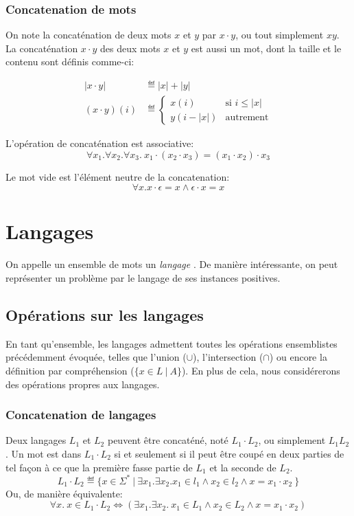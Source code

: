 \subsubsection{Concatenation de mots}

On note la concaténation de deux mots $x$ et $y$ par $x \cdot y$, ou tout simplement $xy$.
La concaténation $x \cdot y$ des deux mots $x$ et $y$ est aussi un mot, dont la taille et le contenu sont définis comme-ci:

\begin{align*}
|x \cdot y| &\eqdef |x| + |y|\\
(x \cdot y)(i) &\eqdef \begin{cases}
x(i) & \text{si $i \leq |x|$}\\
y(i - |x|) & \text{autrement}
\end{cases}
\end{align*}

L'opération de concaténation est associative:
\[
\forall x_1. \forall x_2. \forall x_3.\ x_1 \cdot (x_2 \cdot x_3) = (x_1 \cdot x_2) \cdot x_3   
\]

Le mot vide est l'élément neutre de la concatenation:
\[
\forall x. x \cdot \epsilon = x \wedge \epsilon \cdot x = x
\]

\section{Langages}

On appelle un ensemble de mots un \og \textit{langage} \fg{}.
De manière intéressante, on peut représenter un problème par le langage de ses instances positives.

\subsection{Opérations sur les langages}

En tant qu'ensemble, les langages admettent toutes les opérations ensemblistes précédemment évoquée, telles que l'union ($\cup$), l'intersection ($\cap$) ou encore la définition par compréhension ($\{ x \in L\ |\ A \}$).
En plus de cela, nous considérerons des opérations propres aux langages.

\subsubsection{Concatenation de langages}

Deux langages $L_1$ et $L_2$ peuvent être concaténé, noté $L_1 \cdot L_2$, ou simplement $L_1L_2$.
Un mot est dans $L_1 \cdot L_2$ si et seulement si il peut être coupé en deux parties de tel façon à ce que la première fasse partie de $L_1$ et la seconde de $L_2$.
\[
L_1 \cdot L_2 \eqdef \{ x \in \Sigma^*\ |\ \exists x_1. \exists x_2. x_1 \in l_1 \wedge x_2 \in l_2 \wedge x = x_1 \cdot x_2\ \}
\]
Ou, de manière équivalente:
\[
\forall x.\ x \in L_1 \cdot L_2 \iff (\exists x_1. \exists x_2.\ x_1 \in L_1 \wedge x_2 \in L_2 \wedge x = x_1 \cdot x_2)
\]

